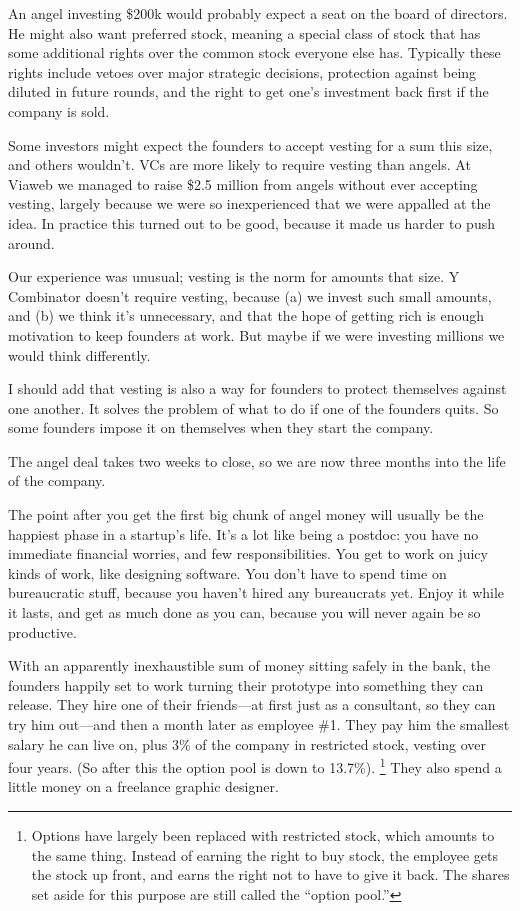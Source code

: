 \documentclass[12pt]{book}
\begin{document}
An angel investing \$200k would probably expect a seat on the board of
directors. He might also want preferred stock, meaning a special class
of stock that has some additional rights over the common stock everyone
else has. Typically these rights include vetoes over major strategic
decisions, protection against being diluted in future rounds, and the
right to get one's investment back first if the company is sold.

Some investors might expect the founders to accept vesting for a sum
this size, and others wouldn't. VCs are more likely to require vesting
than angels. At Viaweb we managed to raise \$2.5 million from angels
without ever accepting vesting, largely because we were so inexperienced
that we were appalled at the idea. In practice this turned out to be
good, because it made us harder to push around.

Our experience was unusual; vesting is the norm for amounts that size. Y
Combinator doesn't require vesting, because (a) we invest such small
amounts, and (b) we think it's unnecessary, and that the hope of getting
rich is enough motivation to keep founders at work. But maybe if we were
investing millions we would think differently.

I should add that vesting is also a way for founders to protect
themselves against one another. It solves the problem of what to do if
one of the founders quits. So some founders impose it on themselves when
they start the company.

The angel deal takes two weeks to close, so we are now three months into
the life of the company.

The point after you get the first big chunk of angel money will usually
be the happiest phase in a startup's life. It's a lot like being a
postdoc: you have no immediate financial worries, and few
responsibilities. You get to work on juicy kinds of work, like designing
software. You don't have to spend time on bureaucratic stuff, because
you haven't hired any bureaucrats yet. Enjoy it while it lasts, and get
as much done as you can, because you will never again be so productive.

With an apparently inexhaustible sum of money sitting safely in the
bank, the founders happily set to work turning their prototype into
something they can release. They hire one of their friends---at first
just as a consultant, so they can try him out---and then a month later
as employee \#1. They pay him the smallest salary he can live on, plus
3\% of the company in restricted stock, vesting over four years. (So
after this the option pool is down to 13.7\%). \footnote{Options have largely been replaced with restricted stock, which
amounts to the same thing. Instead of earning the right to buy stock,
the employee gets the stock up front, and earns the right not to have to
give it back. The shares set aside for this purpose are still called the
``option pool.''}
They also spend a little money on a freelance graphic designer.
\end{document}
